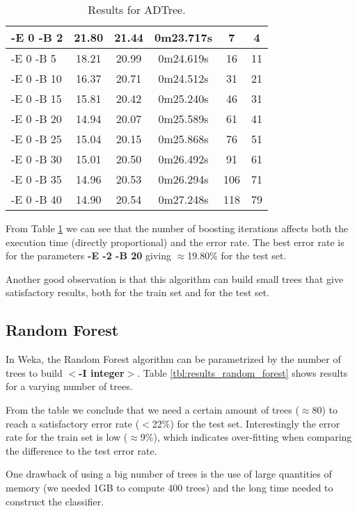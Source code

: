 \documentclass[a4paper]{llncs}
\begin{document}
\begin{table}[ht]
\begin{center}
\begin{tabular}{ | l | c | c | c | c | c |}
    -E 0 -B 2 & 21.80 & 21.44 & 0m23.717s & 7 & 4 \\ \hline
    -E 0 -B 5 & 18.21 & 20.99 & 0m24.619s & 16 & 11 \\ \hline
    -E 0 -B 10 & 16.37 & 20.71 & 0m24.512s & 31 & 21 \\ \hline
    -E 0 -B 15 & 15.81 & 20.42 & 0m25.240s & 46 & 31 \\ \hline
    -E 0 -B 20 & 14.94 & 20.07 & 0m25.589s & 61 & 41 \\ \hline
    -E 0 -B 25 & 15.04 & 20.15 & 0m25.868s & 76 & 51 \\ \hline
    -E 0 -B 30 & 15.01 & 20.50 & 0m26.492s & 91 & 61 \\ \hline
    -E 0 -B 35 & 14.96 & 20.53 & 0m26.294s & 106 & 71 \\ \hline
    -E 0 -B 40 & 14.90 & 20.54 & 0m27.248s & 118 & 79 \\ \hline
    
  \end{tabular}
  \caption{Results for ADTree.}
  \label{tbl:results_adtree}
  \end{center}
\end{table}

From Table \ref{tbl:results_adtree} we can see that the number of boosting iterations affects
both the execution time (directly proportional) and the error rate.
The best error rate is for the parameters \textbf{-E -2 -B 20} giving $\approx$19.80\% for the test set.

Another good observation is that this algorithm can build small trees that give satisfactory results, both for
the train set and for the test set.

\subsection{Random Forest}

In Weka, the Random Forest algorithm can be parametrized by the number
of trees to build \textbf{$<$-I integer$>$}. Table \ref{tbl:results_random_forest} shows results for
a varying number of trees.

From the table we conclude that we need a certain amount of trees ($\approx$80) to
reach a satisfactory error rate ($<$22\%) for the test set. Interestingly
the error rate for the train set is low ($\approx$9\%), which indicates over-fitting
when comparing the difference to the test error rate.

One drawback of using a big number of trees is the use of large
quantities of memory (we needed 1GB to compute 400 trees) and the long time needed to construct the classifier.
\end{document}
